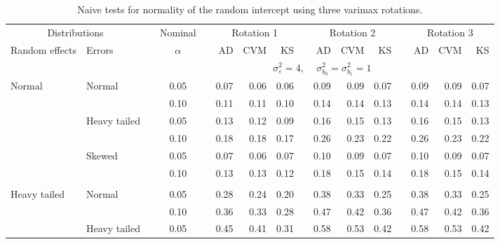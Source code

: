 \documentclass{article} %
\begin{document}
\begin{table}[ht]
\begin{scriptsize}
\begin{center}
\begin{tabular}{ll p{.1cm} c p{.1cm} rrr p{.1cm} rrr p{.1cm} rrr}
   \hline
\end{tabular}
\end{center}
\end{scriptsize}
\end{table}


\begin{table}[ht]
\caption{Naive tests for normality of the random intercept using three varimax rotations.}
\begin{scriptsize}
\begin{center}
\begin{tabular}{ll p{.1cm} c p{.1cm} rrr p{.1cm} rrr p{.1cm} rrr}
  \hline
  \multicolumn{2}{c}{Distributions}& & Nominal & &  \multicolumn{3}{c}{Rotation 1} & & \multicolumn{3}{c}{Rotation 2} & & \multicolumn{3}{c}{Rotation 3}\\ \cline{1-2} \cline{6-8} \cline{10-12} \cline{14-16}
  Random effects & Errors & & $\alpha$ & & AD & CVM & KS & & AD & CVM & KS & & AD & CVM & KS \\ 
   \hline
& && && \multicolumn{9}{c}{$\sigma_{\varepsilon}^2 = 4$, \ \ $\sigma_{b_0}^2 = \sigma_{b_1}^2 = 1$} \\ \cline{6-16}
\rowcolor{gray!20}Normal       & Normal       && 0.05 &&   0.07 & 0.06 & 0.06 && 0.09 & 0.09 & 0.07 && 0.09 & 0.09 & 0.07 \\ 
\rowcolor{gray!20}             &              && 0.10 &&   0.11 & 0.11 & 0.10 && 0.14 & 0.14 & 0.13 && 0.14 & 0.14 & 0.13 \\ 
\rowcolor{gray!20}             & Heavy tailed && 0.05 &&   0.13 & 0.12 & 0.09 && 0.16 & 0.15 & 0.13 && 0.16 & 0.15 & 0.13 \\ 
\rowcolor{gray!20}             &              && 0.10 &&   0.18 & 0.18 & 0.17 && 0.26 & 0.23 & 0.22 && 0.26 & 0.23 & 0.22 \\ 
\rowcolor{gray!20}             & Skewed       && 0.05 &&   0.07 & 0.06 & 0.07 && 0.10 & 0.09 & 0.07 && 0.10 & 0.09 & 0.07 \\ 
\rowcolor{gray!20}             &              && 0.10 &&   0.13 & 0.13 & 0.12 && 0.18 & 0.15 & 0.14 && 0.18 & 0.15 & 0.14 \\ 
             &&&&&&&&&&&&&&&\\
Heavy tailed & Normal       && 0.05 &&   0.28 & 0.24 & 0.20 && 0.38 & 0.33 & 0.25 && 0.38 & 0.33 & 0.25 \\ 
             &              && 0.10 &&   0.36 & 0.33 & 0.28 && 0.47 & 0.42 & 0.36 && 0.47 & 0.42 & 0.36 \\ 
             & Heavy tailed && 0.05 &&   0.45 & 0.41 & 0.31 && 0.58 & 0.53 & 0.42 && 0.58 & 0.53 & 0.42 \\ 

\end{tabular}
\end{center}
\end{scriptsize}
\end{table}
\end{document}
